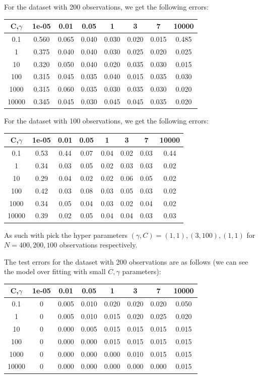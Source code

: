\documentclass[11pt]{article}
\begin{document}
For the dataset with 200 observations, we get the following errors:\\
\begin{tabular}{|c|c|c|c|c|c|c|c|}
\hline
C,$\gamma$ &1e-05&0.01&0.05&1&3&7&10000\\\hline
0.1&0.560&0.065&0.040&0.030&0.020&0.015&0.485\\\hline
1&0.375&0.040&0.040&0.030&0.025&0.020&0.025\\\hline
10&0.320&0.050&0.040&0.020&0.035&0.030&0.015\\\hline
100&0.315&0.045&0.035&0.040&0.015&0.035&0.030\\\hline
1000&0.315&0.060&0.035&0.030&0.035&0.030&0.020\\\hline
10000&0.345&0.045&0.030&0.045&0.045&0.035&0.020\\\hline
\end{tabular}

For the dataset with 100 observations, we get the following errors:\\
\begin{tabular}{|c|c|c|c|c|c|c|c|}
\hline
C,$\gamma$& 1e-05 & 0.01 & 0.05 & 1 & 3 & 7 & 10000\\\hline
0.1 & 0.53 & 0.44 & 0.07 & 0.04 & 0.02 & 0.03 & 0.44\\\hline
1 & 0.34 & 0.03 & 0.05 & 0.02 & 0.03 & 0.03 & 0.02\\\hline
10 & 0.29 & 0.04 & 0.02 & 0.02 & 0.06 & 0.05 & 0.02\\\hline
100 & 0.42 & 0.03 & 0.08 & 0.03 & 0.05 & 0.03 & 0.02\\\hline
1000 & 0.34 & 0.05 & 0.04 & 0.03 & 0.02 & 0.04 & 0.02\\\hline
10000 & 0.39 & 0.02 & 0.05 & 0.04 & 0.04 & 0.03 & 0.03\\\hline
\end{tabular}

As such with pick the hyper parameters $(\gamma,C)=(1,1),(3,100),(1,1)$ for $N=400,200,100$ observations respectively.

The test errors for the dataset with 200 observations are as follows (we can see the model over fitting with small $C,\gamma$ parameters):\\
\begin{tabular}{|c|c|c|c|c|c|c|c|}
\hline
C,$\gamma$&1e-05 & 0.01 & 0.05 & 1 & 3 & 7 & 10000\\\hline
0.1 & 0 & 0.005 & 0.010 & 0.020 & 0.020 & 0.020 & 0.050\\\hline
1 & 0 & 0.005 & 0.010 & 0.015 & 0.020 & 0.025 & 0.020\\\hline
10 & 0 & 0.000 & 0.005 & 0.015 & 0.015 & 0.015 & 0.015\\\hline
100 & 0 & 0.000 & 0.000 & 0.015 & 0.015 & 0.015 & 0.015\\\hline
1000 & 0 & 0.000 & 0.000 & 0.000 & 0.010 & 0.015 & 0.015\\\hline
10000 & 0 & 0.000 & 0.000 & 0.000 & 0.000 & 0.000 & 0.015\\\hline
\end{tabular}
\end{document}
